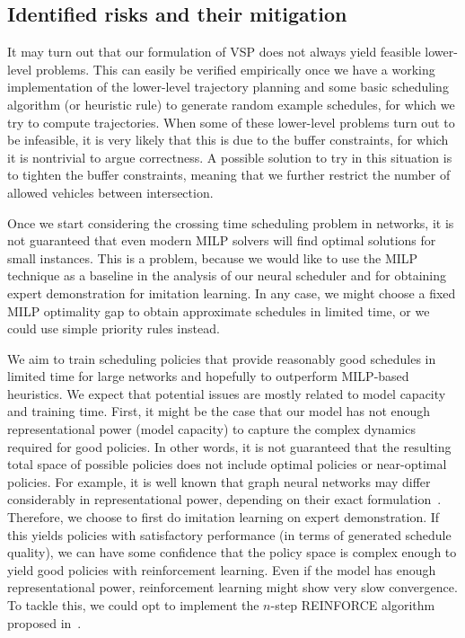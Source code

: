\documentclass[notitlepage]{report}
\begin{document}
\subsection*{Identified risks and their mitigation}

It may turn out that our formulation of VSP does not always yield feasible
lower-level problems. This can easily be verified empirically once we have a
working implementation of the lower-level trajectory planning and some basic
scheduling algorithm (or heuristic rule) to generate random example schedules,
for which we try to compute trajectories. When some of these lower-level
problems turn out to be infeasible, it is very likely that this is due to the
buffer constraints, for which it is nontrivial to argue correctness. A possible
solution to try in this situation is to tighten the buffer constraints, meaning
that we further restrict the number of allowed vehicles between intersection.

Once we start considering the crossing time scheduling problem in networks, it
is not guaranteed that even modern MILP solvers will find optimal solutions for
small instances. This is a problem, because we would like to use the MILP
technique as a baseline in the analysis of our neural scheduler and for
obtaining expert demonstration for imitation learning. In any case, we might
choose a fixed MILP optimality gap to obtain approximate schedules in limited
time, or we could use simple priority rules instead.

We aim to train scheduling policies that provide reasonably good schedules in
limited time for large networks and hopefully to outperform MILP-based
heuristics. We expect that potential issues are mostly related to model capacity
and training time.
First, it might be the case that our model has not enough representational power
(model capacity) to capture the complex dynamics required for good policies. In
other words, it is not guaranteed that the resulting total space of possible
policies does not include optimal policies or near-optimal policies. For
example, it is well known that graph neural networks may differ considerably in
representational power, depending on their exact
formulation~\cite{xuHowPowerfulAre2019}.
%
Therefore, we choose to first do imitation learning on expert demonstration. If
this yields policies with satisfactory performance (in terms of generated
schedule quality), we can have some confidence that the policy space is complex
enough to yield good policies with reinforcement learning.
Even if the model has enough representational power, reinforcement learning
might show very slow convergence. To tackle this, we could opt to implement the
$n$-step REINFORCE algorithm proposed in~\cite{zhangDeepReinforcementLearning2024}.
\end{document}
